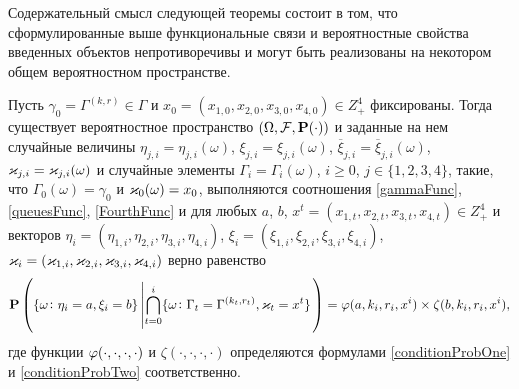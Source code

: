 \documentclass[a4paper,12pt,russian]{extarticle}
\newcommand{\G}{\Gamma}
\newcommand{\ga}[1]{\Gamma^{\left( #1 \right)} }
\renewcommand{\Pr}{{\mathbf P}}
\begin{document}
Содержательный смысл следующей теоремы состоит в том, что сформулированные выше функциональные связи и вероятностные свойства введенных объектов непротиворечивы и могут быть реализованы на некотором общем вероятностном пространстве.
\begin{theorem}
Пусть $\gamma_0=\ga{k,r} \in \G$ и $x_0=(x_{1,0},x_{2,0}, x_{3,0},x_{4,0})\in Z_+^4$ фиксированы.
Тогда существует вероятностное пространство $(\Omega, {\cal F}, \Pr(\cdot))$ и заданные на нем случайные величины $\eta_{j,i}=\eta_{j,i}(\omega)$, $\xi_{j,i}=\xi_{j,i}(\omega)$, $\overline{\xi}_{j,i}=\overline{\xi}_{j,i}(\omega)$,  $\varkappa_{j,i}=\varkappa_{j,i}(\omega)$ и случайные элементы $\G_i=\G_i(\omega)$, $i\geqslant 0$, $j\in \{1, 2, 3, 4\}$, такие, что $\G_0(\omega) = \gamma_0$ и $\varkappa_0(\omega)=x_0$, выполняются соотношения \eqref{gammaFunc}, \eqref{queuesFunc}, \eqref{FourthFunc} и для любых $a$, $b$, $x^t=(x_{1,t},x_{2,t},x_{3,t},x_{4,t}) \in Z_+^4$ и векторов $\eta_i=(\eta_{1,i}, \eta_{2,i}, \eta_{3,i}, \eta_{4,i})$, $\xi_i=(\xi_{1,i}, \xi_{2,i}, \xi_{3,i}, \xi_{4,i})$, $\varkappa_i=(\varkappa_{1,i}, \varkappa_{2,i}, \varkappa_{3,i}, \varkappa_{4,i})$ верно равенство
\begin{equation}
\Pr \left(\{ \omega \colon \eta_i = a, \xi_i=b\} \left|\bigcap_{t=0}^{i}\{\omega\colon \G_t=\ga{k_t,r_t}, \vk_t=x^t\}\right.\right)=
\vp(a,k_i,r_i,x^i)\times \zeta(b,k_i,r_i,x^i),
\label{ProbablititiesToProve}
\end{equation}
где функции $\varphi(\cdot, \cdot, \cdot, \cdot)$ и $\zeta(\cdot, \cdot, \cdot, \cdot)$ определяются формулами \eqref{conditionProbOne} и \eqref{conditionProbTwo} соответственно.

\label{myTheorem}
\end{theorem}
\end{document}
